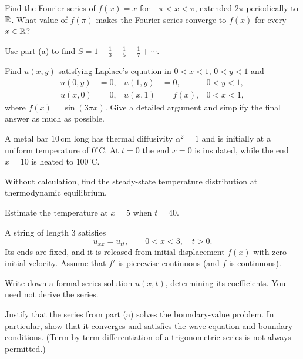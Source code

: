 \documentclass[11pt,oneside]{article}
\begin{document}
\begin{problem}
\begin{problemsubparts}
\item Find the Fourier series of $f(x)=x$ for $-\pi<x<\pi$, extended $2\pi$-periodically to $\mathbb{R}$. What value of $f(\pi)$ makes the Fourier series converge to $f(x)$ for every $x\in\mathbb{R}$?
\item Use part (a) to find $\displaystyle S=1-\frac13+\frac15-\frac17+\cdots$.
\end{problemsubparts}
\end{problem}

\begin{problem}
Find $u(x,y)$ satisfying Laplace's equation in $0<x<1$, $0<y<1$ and
\[
\begin{aligned}
u(0,y)&=0,&u(1,y)&=0,&0<y<1,\\
u(x,0)&=0,&u(x,1)&=f(x),&0<x<1,
\end{aligned}
\]
where $f(x)=\sin(3\pi x)$. Give a detailed argument and simplify the final answer as much as possible.
\end{problem}

\begin{problem}
A metal bar $10\,\mathrm{cm}$ long has thermal diffusivity $\alpha^2=1$ and is initially at a uniform temperature of $0^\circ\mathrm C$. At $t=0$ the end $x=0$ is insulated, while the end $x=10$ is heated to $100^\circ\mathrm C$.
\begin{problemsubparts}
\item Without calculation, find the steady-state temperature distribution at thermodynamic equilibrium.
\item Estimate the temperature at $x=5$ when $t=40$.
\end{problemsubparts}
\end{problem}

\begin{problem}
A string of length $3$ satisfies
\[
u_{xx}=u_{tt},\qquad 0<x<3,\quad t>0.
\]
Its ends are fixed, and it is released from initial displacement $f(x)$ with zero initial velocity. Assume that $f'$ is piecewise continuous (and $f$ is continuous).
\begin{problemsubparts}
\item Write down a formal series solution $u(x,t)$, determining its coefficients. You need not derive the series.
\item Justify that the series from part (a) solves the boundary-value problem. In particular, show that it converges and satisfies the wave equation and boundary conditions. (Term-by-term differentiation of a trigonometric series is not always permitted.)
\end{problemsubparts}
\end{problem}
\end{document}
